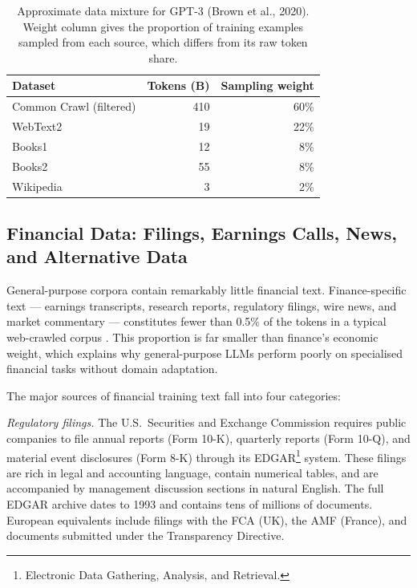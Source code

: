 \begin{context}
\begin{example}
\begin{table}[H]
  \centering
  \caption{Approximate data mixture for GPT-3 (Brown et al., 2020).
           Weight column gives the proportion of training examples sampled
           from each source, which differs from its raw token share.}
  \label{tab:gpt3-corpus}
  \begin{tabular}{lrr}
    \toprule
    Dataset & Tokens (B) & Sampling weight \\
    \midrule
    Common Crawl (filtered) & 410 & 60\% \\
    WebText2                 &  19 & 22\% \\
    Books1                   &  12 &  8\% \\
    Books2                   &  55 &  8\% \\
    Wikipedia                &   3 &  2\% \\
    \bottomrule
  \end{tabular}
\end{table}
\end{example}

\subsection{Financial Data: Filings, Earnings Calls, News, and Alternative Data}
\label{subsec:financial-data}

General-purpose corpora contain remarkably little financial text.  Finance-specific
text --- earnings transcripts, research reports, regulatory filings, wire news,
and market commentary --- constitutes fewer than 0.5\% of the tokens in a typical
web-crawled corpus \cite{wu2023bloomberggpt}.  This proportion is far
smaller than finance's economic weight, which explains why general-purpose LLMs
perform poorly on specialised financial tasks without domain adaptation.

The major sources of financial training text fall into four categories:

\emph{Regulatory filings.}  The U.S.~Securities and Exchange Commission
requires public companies to file annual reports (Form 10-K), quarterly reports
(Form 10-Q), and material event disclosures (Form 8-K) through its
EDGAR\footnote{Electronic Data Gathering, Analysis, and Retrieval.} system.
These filings are rich in legal and accounting language, contain numerical
tables, and are accompanied by management discussion sections in natural
English.  The full EDGAR archive dates to 1993 and contains tens of millions
of documents.  European equivalents include filings with the FCA (UK),
the AMF (France), and documents submitted under the Transparency Directive.


\end{context}
